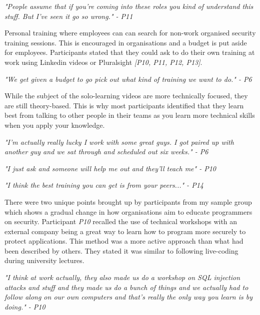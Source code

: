 \newline
\par 
\textit{"People assume that if you're coming into these roles you kind of understand this stuff. But I've seen it go so wrong." - P11}
\newline
\par
Personal training where employees can can search for non-work organised security training sessions. This is encouraged in organisations and a budget is put aside for employees. Participants stated that they could ask to do their own training at work using Linkedin videos or Pluralsight \textit{[P10, P11, P12, P13]}. 
\newline
\par
\textit{"We get given a budget to go pick out what kind of training we want to do." - P6}
\newline
\par 
While the subject of the solo-learning videos are more technically focused, they are still theory-based. This is why most participants identified that they learn best from talking to other people in their teams as you learn more technical skills when you apply your knowledge. 
\newline
\par
\textit{"I'm actually really lucky I work with some great guys. I got paired up with another guy and we sat through and scheduled out six weeks." - P6}
\newline
\par
\textit{"I just ask and someone will help me out and they'll teach me" - P10}
\newline
\par
\textit{"I think the best training you can get is from your peers..." - P14 }
\newline
\par
There were two unique points brought up by participants from my sample group which shows a gradual change in how organisations aim to educate programmers on security. Participant \textit{P10} recalled the use of technical workshops with an external company being a great way to learn how to program more securely to protect applications. This method was a more active approach than what had been described by others. They stated it was similar to following live-coding during university lectures. 
\newline
\par
\textit{"I think at work actually, they also made us do a workshop on SQL injection attacks and stuff and they made us do a bunch of things and we actually had to follow along on our own computers and that's really the only way you learn is by doing." - P10}
